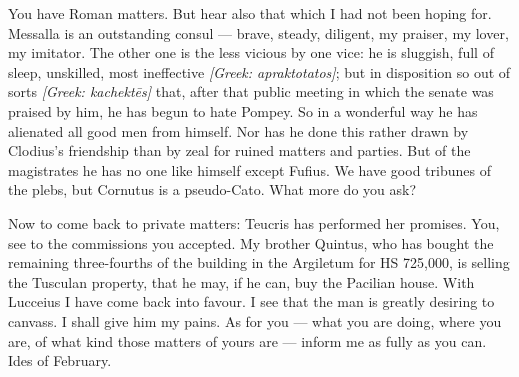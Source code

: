  You have Roman matters. But hear also that which I had not been hoping for. Messalla is an outstanding consul --- brave, steady, diligent, my praiser, my lover, my imitator. The other one is the less vicious by one vice: he is sluggish, full of sleep, unskilled, most ineffective \textit{[Greek: apraktotatos]}; but in disposition so out of sorts \textit{[Greek: kachekt\=es]} that, after that public meeting in which the senate was praised by him, he has begun to hate Pompey. So in a wonderful way he has alienated all good men from himself. Nor has he done this rather drawn by Clodius's friendship than by zeal for ruined matters and parties. But of the magistrates he has no one like himself except Fufius. We have good tribunes of the plebs, but Cornutus is a pseudo-Cato. What more do you ask?

 Now to come back to private matters: Teucris has performed her promises. You, see to the commissions you accepted. My brother Quintus, who has bought the remaining three-fourths of the building in the Argiletum for HS 725,000, is selling the Tusculan property, that he may, if he can, buy the Pacilian house. With Lucceius I have come back into favour. I see that the man is greatly desiring to canvass. I shall give him my pains. As for you --- what you are doing, where you are, of what kind those matters of yours are --- inform me as fully as you can. Ides of February.
